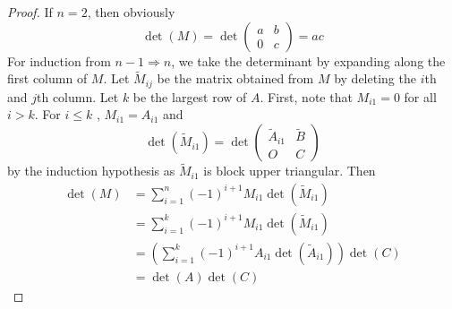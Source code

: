 \begin{homeworkProblem}

\solution

\begin{proof}
If $n = 2$, then obviously \[
\det(M) = \det\begin{pmatrix}
    a & b \\
    0 & c
\end{pmatrix} = ac
\]
For induction from $n-1 \Rightarrow n$, we take the determinant by expanding along the first column of $M$. Let $\tilde{M}_{ij}$ be the matrix obtained from $M$ by deleting the $i$th and $j$th column. Let $k$ be the largest row of $A$. First, note that $M_{i1} = 0$ for all $i > k$. For $i \leq k$ , $M_{i1} = A_{i1}$ and \[
    \det(\tilde{M}_{i1}) = \det\begin{pmatrix}
        \tilde{A}_{i1} & \tilde{B} \\
        O & C
    \end{pmatrix}
\]
by the induction hypothesis as $\tilde{M}_{i1}$ is block upper triangular. Then
\[
    \begin{aligned}
        \det(M) &= \sum_{i=1}^{n}(-1)^{i+1}M_{i1}\det(\tilde{M}_{i1}) \\
        &= \sum_{i=1}^{k}(-1)^{i+1}M_{i1}\det(\tilde{M}_{i1}) \\
        &= \left(\sum_{i=1}^{k}(-1)^{i+1}A_{i1}\det(\tilde{A}_{i1})\right)\det(C)\\
        &= \det(A)\det(C)
    \end{aligned}
\]
\end{proof}
\end{homeworkProblem}
